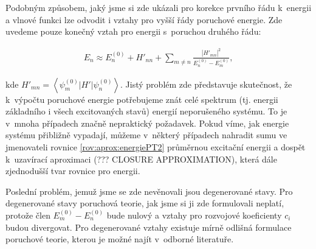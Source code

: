 Podobným způsobem, jaký jsme si zde ukázali pro korekce prvního řádu k~energii a vlnové funkci lze odvodit i vztahy pro vyšší řády poruchové energie. Zde uvedeme pouze konečný vztah pro energii s~poruchou druhého řádu:

\begin{eqnarray}
E_n\approx E_n^{(0)}+H'_{nn}+\sum_{m\neq n} \frac{\left | H'_{mn} \right |^2}{E_n^{(0)}-E_m^{(0)}},
\label{rov:aprox:energiePT2}
\end{eqnarray}

\noindent kde $H'_{mn}=\left < \psi_m^{(0)}|H'|\psi_n^{(0)}\right >$. Jistý problém zde představuje skutečnost, že k~výpočtu poruchové energie potřebujeme znát celé spektrum (tj. energii základního i všech excitovaných stavů) energií neporušeného systému. To je v~mnoha případech značně nepraktický požadavek. Pokud víme, jak energie systému přibližně vypadají, můžeme v~některý případech nahradit sumu ve jmenovateli rovnice \ref{rov:aprox:energiePT2} průměrnou excitační energii a dospět k~uzavírací aproximaci (??? CLOSURE APPROXIMATION), která dále zjednodušší tvar rovnice pro energii. 

Poslední problém, jemuž jsme se zde nevěnovali jsou degenerované stavy. Pro degenerované stavy poruchová teorie, jak jsme si ji zde formulovali neplatí, protože člen $E_m^{(0)}-E_n^{(0)}$ bude nulový a vztahy pro rozvojové koeficienty $c_i$ budou divergovat. Pro degenerované vztahy existuje mírně odlišná formulace poruchové teorie, kterou je možné najít v~odborné literatuře. 






